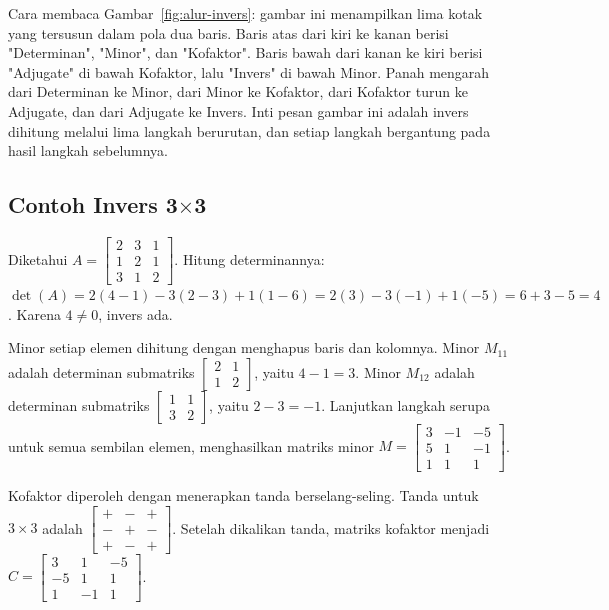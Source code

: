 \documentclass[11pt,a4paper]{article}
\begin{document}
Cara membaca Gambar~\ref{fig:alur-invers}: gambar ini menampilkan lima kotak yang tersusun dalam pola dua baris. Baris atas dari kiri ke kanan berisi "Determinan", "Minor", dan "Kofaktor". Baris bawah dari kanan ke kiri berisi "Adjugate" di bawah Kofaktor, lalu "Invers" di bawah Minor. Panah mengarah dari Determinan ke Minor, dari Minor ke Kofaktor, dari Kofaktor turun ke Adjugate, dan dari Adjugate ke Invers. Inti pesan gambar ini adalah invers dihitung melalui lima langkah berurutan, dan setiap langkah bergantung pada hasil langkah sebelumnya.

\subsection{Contoh Invers 3$\times$3}

Diketahui $A=\begin{bmatrix}2&3&1\\1&2&1\\3&1&2\end{bmatrix}$. Hitung determinannya: $\det(A)=2(4-1)-3(2-3)+1(1-6)=2(3)-3(-1)+1(-5)=6+3-5=4$. Karena $4 \ne 0$, invers ada.

Minor setiap elemen dihitung dengan menghapus baris dan kolomnya. Minor $M_{11}$ adalah determinan submatriks $\begin{bmatrix}2&1\\1&2\end{bmatrix}$, yaitu $4-1=3$. Minor $M_{12}$ adalah determinan submatriks $\begin{bmatrix}1&1\\3&2\end{bmatrix}$, yaitu $2-3=-1$. Lanjutkan langkah serupa untuk semua sembilan elemen, menghasilkan matriks minor $M=\begin{bmatrix}3&-1&-5\\5&1&-1\\1&1&1\end{bmatrix}$.

Kofaktor diperoleh dengan menerapkan tanda berselang-seling. Tanda untuk $3 \times 3$ adalah $\begin{bmatrix}+&-&+\\-&+&-\\+&-&+\end{bmatrix}$. Setelah dikalikan tanda, matriks kofaktor menjadi $C=\begin{bmatrix}3&1&-5\\-5&1&1\\1&-1&1\end{bmatrix}$.
\end{document}
